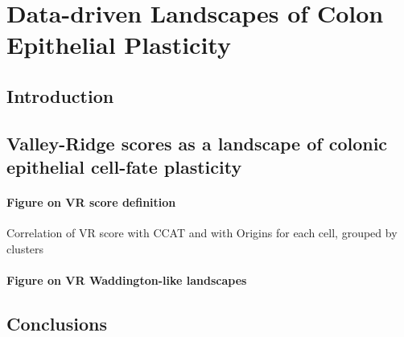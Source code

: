 \chapter{Data-driven Landscapes of Colon Epithelial Plasticity}
\label{05vr}

\section{Introduction}

\section{Valley-Ridge scores as a landscape of colonic epithelial cell-fate plasticity}

\subsubsection{Figure on VR score definition}

Correlation of VR score with CCAT and with Origins for each cell, grouped by clusters

\subsubsection{Figure on VR Waddington-like landscapes}



\section{Conclusions}





